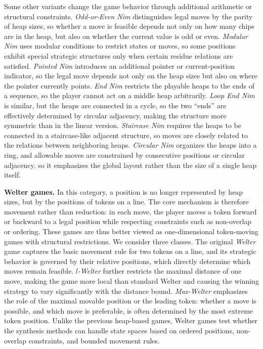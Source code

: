 \documentclass[review]{elsarticle}
\begin{document}
{Some other variants change the game behavior through additional arithmetic or structural constraints. \emph{Odd-or-Even Nim} distinguishes legal moves by the parity of heap sizes, so whether a move is feasible depends not only on how many chips are in the heap, but also on whether the current value is odd or even. 
\emph{Modular Nim} uses modular conditions to restrict states or moves, so some positions exhibit special strategic structures only when certain residue relations are satisfied. 
\emph{Pointed Nim} introduces an additional pointer or current-position indicator, so the legal move depends not only on the heap sizes but also on where the pointer currently points. 
\emph{End Nim} restricts the playable heaps to the ends of a sequence, so the player cannot act on a middle heap arbitrarily. 
\emph{Loop End Nim} is similar, but the heaps are connected in a cycle, so the two ``ends'' are effectively determined by circular adjacency, making the structure more symmetric than in the linear version. 
\emph{Staircase Nim} requires the heaps to be connected in a staircase-like adjacent structure, so moves are closely related to the relations between neighboring heaps. 
\emph{Circular Nim} organizes the heaps into a ring, and allowable moves are constrained by consecutive positions or circular adjacency, so it emphasizes the global layout rather than the size of a single heap itself.}

{\color{red}\textbf{Welter games.} In this category, a position is no longer represented by heap sizes, but by the positions of tokens on a line. The core mechanism is therefore movement rather than reduction: in each move, the player moves a token forward or backward to a legal position while respecting constraints such as non-overlap or ordering. These games are thus better viewed as one-dimensional token-moving games with structural restrictions. We consider three classes. The original \emph{Welter} game captures the basic movement rule for two tokens on a line, and its strategic behavior is governed by their relative positions, which directly determine which moves remain feasible. \emph{$l$-Welter} further restricts the maximal distance of one move, making the game more local than standard Welter and causing the winning strategy to vary significantly with the distance bound. \emph{Max-Welter} emphasizes the role of the maximal movable position or the leading token: whether a move is possible, and which move is preferable, is often determined by the most extreme token position. Unlike the previous heap-based games, Welter games test whether the synthesis methods can handle state spaces based on ordered positions, non-overlap constraints, and bounded movement rules.}
\end{document}
